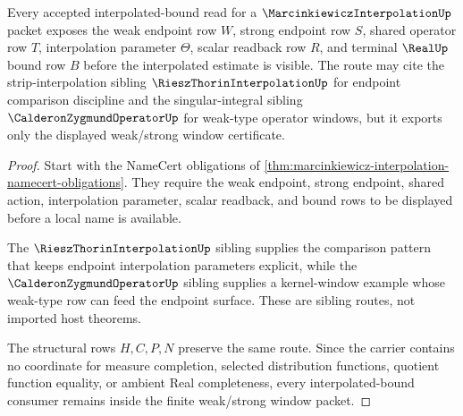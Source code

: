 \begin{theorem}
\label{thm:marcinkiewicz-interpolation-weak-strong-window}
Every accepted interpolated-bound read for a $\MarcinkiewiczInterpolationUp$ packet exposes the weak endpoint row $W$, strong endpoint row $S$, shared operator row $T$, interpolation parameter $\Theta$, scalar readback row $R$, and terminal $\RealUp$ bound row $B$ before the interpolated estimate is visible. The route may cite the strip-interpolation sibling $\RieszThorinInterpolationUp$ for endpoint comparison discipline and the singular-integral sibling $\CalderonZygmundOperatorUp$ for weak-type operator windows, but it exports only the displayed weak/strong window certificate.
\end{theorem}
\begin{proof}
Start with the NameCert obligations of \autoref{thm:marcinkiewicz-interpolation-namecert-obligations}. They require the weak endpoint, strong endpoint, shared action, interpolation parameter, scalar readback, and bound rows to be displayed before a local name is available.

The $\RieszThorinInterpolationUp$ sibling supplies the comparison pattern that keeps endpoint interpolation parameters explicit, while the $\CalderonZygmundOperatorUp$ sibling supplies a kernel-window example whose weak-type row can feed the endpoint surface. These are sibling routes, not imported host theorems.

The structural rows $H,C,P,N$ preserve the same route. Since the carrier contains no coordinate for measure completion, selected distribution functions, quotient function equality, or ambient Real completeness, every interpolated-bound consumer remains inside the finite weak/strong window packet.
\end{proof}



